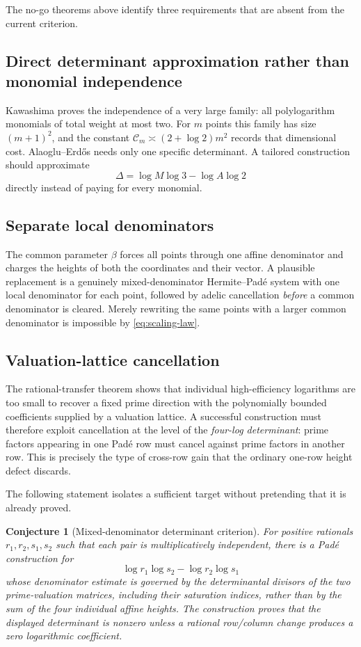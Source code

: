 \documentclass[11pt]{article}
\newtheorem{conjecture}[theorem]{Conjecture}
\theoremstyle{definition}
\newcommand{\Kc}{\mathcal C}
\begin{document}
The no-go theorems above identify three requirements that are absent from the current
criterion.

\subsection{Direct determinant approximation rather than monomial independence}

Kawashima proves the independence of a very large family: all polylogarithm monomials of total
weight at most two.  For $m$ points this family has size $(m+1)^2$, and the constant
$\Kc_m\asymp(2+\log2)m^2$ records that dimensional cost.  Alaoglu--Erd\H{o}s needs only one
specific determinant.  A tailored construction should approximate
\[
 \Delta=\log M\log3-\log A\log2
\]
directly instead of paying for every monomial.

\subsection{Separate local denominators}

The common parameter $\beta$ forces all points through one affine denominator and charges the
heights of both the coordinates and their vector.  A plausible replacement is a genuinely
mixed-denominator Hermite--Pad\'e system with one local denominator for each point, followed by
adelic cancellation \emph{before} a common denominator is cleared.  Merely rewriting the same
points with a larger common denominator is impossible by \eqref{eq:scaling-law}.

\subsection{Valuation-lattice cancellation}

The rational-transfer theorem shows that individual high-efficiency logarithms are too small
to recover a fixed prime direction with the polynomially bounded coefficients supplied by a
valuation lattice.  A successful construction must therefore exploit cancellation at the
level of the \emph{four-log determinant}: prime factors appearing in one Pad\'e row must cancel
against prime factors in another row.  This is precisely the type of cross-row gain that the
ordinary one-row height defect discards.

The following statement isolates a sufficient target without pretending that it is already
proved.

\begin{conjecture}[Mixed-denominator determinant criterion]\label{conj:mixed}
For positive rationals $r_1,r_2,s_1,s_2$ such that each pair is multiplicatively independent,
there is a Pad\'e construction for
\[
 \log r_1\log s_2-\log r_2\log s_1
\]
whose denominator estimate is governed by the determinantal divisors of the two prime-valuation
matrices, including their saturation indices, rather than by the sum of the four individual
affine heights.  The construction proves that the displayed determinant is nonzero unless a
rational row/column change produces a zero logarithmic coefficient.
\end{conjecture}
\end{document}

